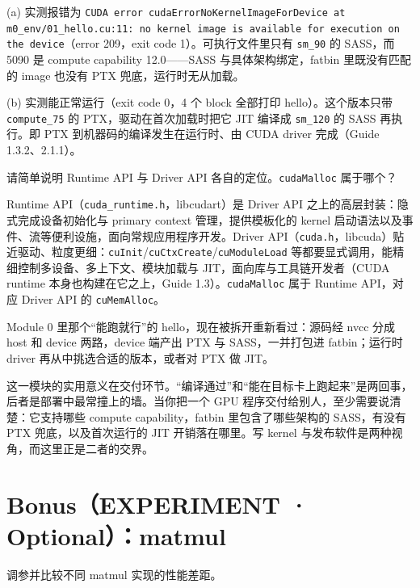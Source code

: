 \documentclass[11pt,a4paper,fontset=none]{ctexart}
\begin{document}
(a) 实测报错为 \texttt{CUDA error cudaErrorNoKernelImageForDevice at m0\_env/01\_hello.cu:11: no kernel image is available for execution on the device}（error 209，exit code 1）。可执行文件里只有 \texttt{sm\_90} 的 SASS，而 5090 是 compute capability 12.0——SASS 与具体架构绑定，fatbin 里既没有匹配的 image 也没有 PTX 兜底，运行时无从加载。

(b) 实测能正常运行（exit code 0，4 个 block 全部打印 hello）。这个版本只带 \texttt{compute\_75} 的 PTX，驱动在首次加载时把它 JIT 编译成 \texttt{sm\_120} 的 SASS 再执行。即 PTX 到机器码的编译发生在运行时、由 CUDA driver 完成（Guide 1.3.2、2.1.1）。

请简单说明 Runtime API 与 Driver API 各自的定位。\texttt{cudaMalloc} 属于哪个？

Runtime API（\texttt{cuda\_runtime.h}，libcudart）是 Driver API 之上的高层封装：隐式完成设备初始化与 primary context 管理，提供模板化的 kernel 启动语法以及事件、流等便利设施，面向常规应用程序开发。Driver API（\texttt{cuda.h}，libcuda）贴近驱动、粒度更细：\texttt{cuInit}/\texttt{cuCtxCreate}/\texttt{cuModuleLoad} 等都要显式调用，能精细控制多设备、多上下文、模块加载与 JIT，面向库与工具链开发者（CUDA runtime 本身也构建在它之上，Guide 1.3）。\texttt{cudaMalloc} 属于 Runtime API，对应 Driver API 的 \texttt{cuMemAlloc}。

\begin{lookback}
  Module 0 里那个“能跑就行”的 hello，现在被拆开重新看过：源码经 nvcc 分成 host 和 device 两路，device 端产出 PTX 与 SASS，一并打包进 fatbin；运行时 driver 再从中挑选合适的版本，或者对 PTX 做 JIT。

  这一模块的实用意义在交付环节。“编译通过”和“能在目标卡上跑起来”是两回事，后者是部署中最常撞上的墙。当你把一个 GPU 程序交付给别人，至少需要说清楚：它支持哪些 compute capability，fatbin 里包含了哪些架构的 SASS，有没有 PTX 兜底，以及首次运行的 JIT 开销落在哪里。写 kernel 与发布软件是两种视角，而这里正是二者的交界。
\end{lookback}

\clearpage
\section*{Bonus（EXPERIMENT · Optional）：matmul}

调参并比较不同 matmul 实现的性能差距。
\end{document}
